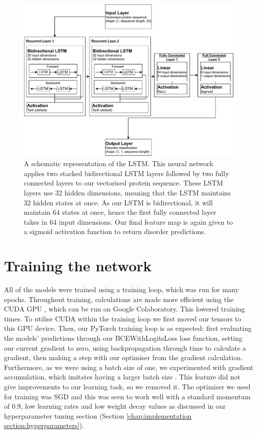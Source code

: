 \documentclass{l4proj}
\begin{document}
\begin{figure}[!ht]
    \centering
    \includegraphics[width=0.95\linewidth]{images/RNNdraw.pdf}    

    \caption{A schematic representation of the LSTM. This neural network applies two stacked bidirectional LSTM layers followed by two fully connected layers to our vectorised protein sequence. These LSTM layers use 32 hidden dimensions, meaning that the LSTM maintains 32 hidden states at once. As our LSTM is bidirectional, it will maintain 64 states at once, hence the first fully connected layer takes in 64 input dimensions. Our final feature map is again given to a sigmoid activation function to return disorder predictions.}

    \label{fig:RNN} 
\end{figure}

\section{Training the network}

All of the models were trained using a training loop, which was run for many epochs. Throughout training, calculations are made more efficient using the CUDA GPU \citep{Nickolls:08}, which can be run on Google Colaboratory. This lowered training times. To utilise CUDA within the training loop we first moved our tensors to this GPU device. Then, our PyTorch training loop is as expected: first evaluating the models' predictions through our BCEWithLogitsLoss loss function, setting our current gradient to zero, using backpropagation through time to calculate a gradient, then making a step with our optimiser from the gradient calculation. Furthermore, as we were using a batch size of one, we experimented with gradient accumulation, which imitates having a larger batch size \citep{Bhattacharyya:20}. This feature did not give improvements to our learning task, so we removed it. The optimiser we used for training was SGD and this was seen to work well with a standard momentum of 0.9, low learning rates and low weight decay values as discussed in our hyperparameter tuning section (Section \ref{chap:implementation section:hyperparameters}).
\end{document}
